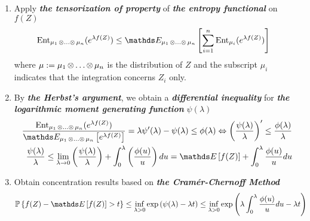 \documentclass[11pt]{article}
\begin{document}
\begin{itemize}
\begin{remark}
\begin{enumerate}
\item Apply \emph{\textbf{the tensorization of property}} of \emph{\textbf{the entropy functional}} on $f(Z)$ 
\begin{align*}
\text{Ent}_{\mu_1 \xdotx{\otimes} \mu_n}(e^{\lambda f(Z)}) &\le \E{\mu_1 \xdotx{\otimes} \mu_n}{\sum_{i=1}^{n}\text{Ent}_{\mu_i}(e^{\lambda f(Z)})}
\end{align*} where $\mu := \mu_1 \,{\otimes}\ldots{\otimes}\, \mu_n$ is the distribution of $Z$ and the subscript $\mu_i$ indicates that the integration concerns $Z_i$ only.
\item By \emph{\textbf{the Herbst's argument}}, we obtain a \emph{\textbf{differential inequality}} for \emph{\textbf{the logarithmic moment generating function}} $\psi(\lambda)$
\begin{align*}
\frac{\text{Ent}_{\mu_1 \xdotx{\otimes} \mu_n}(e^{\lambda f(Z)})}{\E{\mu_1 \xdotx{\otimes} \mu_n}{e^{\lambda f(Z)}}} = \lambda \psi'(\lambda) - \psi(\lambda) \le \phi(\lambda) \Leftrightarrow \paren{\frac{\psi(\lambda)}{\lambda}}' \le \frac{\phi(\lambda)}{\lambda} \\
\frac{\psi(\lambda)}{\lambda} \le \lim\limits_{\lambda \to 0}\paren{\frac{\psi(\lambda)}{\lambda}} + \int_{0}^{\lambda} \paren{\frac{\phi(u)}{u}}du = \E{}{f(Z)} + \int_{0}^{\lambda} \frac{\phi(u)}{u}du
\end{align*}

\item Obtain concentration results based on \textbf{\emph{the Cram{\'e}r-Chernoff Method}}
\begin{align*}
\bP\set{f(Z) - \E{}{f(Z)} > t} &\le \inf_{\lambda >0 }\exp\paren{\psi(\lambda) - \lambda t} \le \inf_{\lambda >0 }\exp\paren{ \lambda \int_{0}^{\lambda} \frac{\phi(u)}{u}du - \lambda t}
\end{align*}
\end{enumerate}
\end{remark}

  

\end{itemize}
\end{document}
